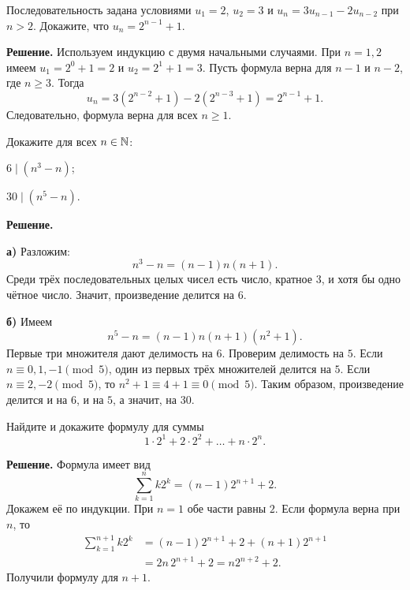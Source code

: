 \begin{problems}
\item Последовательность задана условиями $u_1=2$, $u_2=3$ и $u_n=3u_{n-1}-2u_{n-2}$ при $n>2$. Докажите, что $u_n=2^{n-1}+1$.
\par\smallskip\noindent\textbf{Решение.} Используем индукцию с двумя начальными случаями. При $n=1,2$ имеем $u_1=2^0+1=2$ и $u_2=2^1+1=3$. Пусть формула верна для $n-1$ и $n-2$, где $n\ge3$. Тогда
\[
u_n=3(2^{n-2}+1)-2(2^{n-3}+1)
=2^{n-1}+1.
\]
Следовательно, формула верна для всех $n\ge1$.\par

\item Докажите для всех $n\in\mathbb{N}$:
\begin{parts}
  \item $6\mid(n^3-n)$;
  \item $30\mid(n^5-n)$.
\end{parts}
\par\smallskip\noindent\textbf{Решение.} \par\textbf{а)} Разложим:
\[
n^3-n=(n-1)n(n+1).
\]
Среди трёх последовательных целых чисел есть число, кратное $3$, и хотя бы одно чётное число. Значит, произведение делится на $6$.
\par\textbf{б)} Имеем
\[
n^5-n=(n-1)n(n+1)(n^2+1).
\]
Первые три множителя дают делимость на $6$. Проверим делимость на $5$. Если $n\equiv0,1,-1\pmod5$, один из первых трёх множителей делится на $5$. Если $n\equiv2,-2\pmod5$, то $n^2+1\equiv4+1\equiv0\pmod5$. Таким образом, произведение делится и на $6$, и на $5$, а значит, на $30$.\par

\item Найдите и докажите формулу для суммы
\[
1\cdot 2^1+2\cdot 2^2+\ldots+n\cdot 2^n.
\]
\par\smallskip\noindent\textbf{Решение.} Формула имеет вид
\[
\boxed{\sum_{k=1}^{n}k2^k=(n-1)2^{n+1}+2}.
\]
Докажем её по индукции. При $n=1$ обе части равны $2$. Если формула верна при $n$, то
\[
\begin{aligned}
\sum_{k=1}^{n+1}k2^k
&=(n-1)2^{n+1}+2+(n+1)2^{n+1}\\
&=2n\,2^{n+1}+2
=n2^{n+2}+2.
\end{aligned}
\]
Получили формулу для $n+1$.\par


\end{problems}
